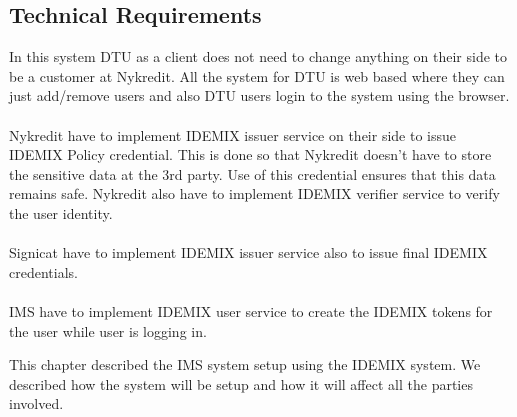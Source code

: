 \subsection{Technical Requirements}
In this system DTU as a client does not need to change anything on their side to be a customer at Nykredit. All the system for DTU is web based where they can just add/remove users and also DTU users login to the system using the browser.
\\
\\Nykredit have to implement IDEMIX issuer service on their side to issue IDEMIX Policy credential. This is done so that Nykredit doesn’t have to store the sensitive data at the 3rd party. Use of this credential ensures that this data remains safe. Nykredit also have to implement IDEMIX verifier service to verify the user identity.
\\
\\Signicat have to implement IDEMIX issuer service also to issue final IDEMIX credentials.
\\\\
IMS have to implement IDEMIX user service to create the IDEMIX tokens for the user while user is logging in.

This chapter described the IMS system setup using the IDEMIX system. We described how the system will be setup and how it will affect all the parties involved.

